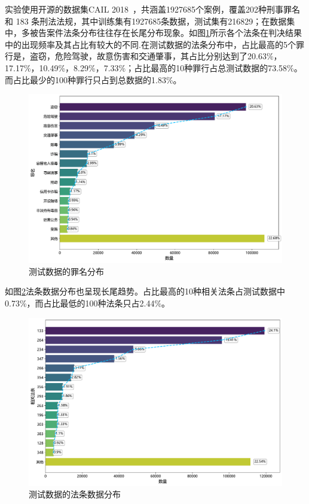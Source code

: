 实验使用开源的数据集CAIL 2018~\cite{xiao2018cail2018largescalelegaldataset}，共涵盖1927685个案例，覆盖202种刑事罪名和 183 条刑法法规，其中训练集有1927685条数据，测试集有216829；在数据集中，多被告案件法条分布往往存在长尾分布现象。如图\ref{fig:acc_dis}所示各个法条在判决结果中的出现频率及其占比有较大的不同.在测试数据的法条分布中，占比最高的5个罪行是，盗窃，危险驾驶，故意伤害和交通肇事，其占比分别达到了20.63\%，17.17\%，10.49\%，8.29\%，7.33\%；占比最高的10种罪行占总测试数据的73.58\%。而占比最少的100种罪行只占到总数据的1.83\%。
\begin{figure}[H]
		\centering
		\includegraphics[width=1\linewidth]{fig/accusation_distribution.pdf}
		\caption{测试数据的罪名分布}
		\label{fig:acc_dis}
\end{figure}
如图\ref{fig:art_dis}法条数据分布也呈现长尾趋势。占比最高的10种相关法条占测试数据中0.73\%，而占比最低的100种法条只占2.44\%。
\begin{figure}[H]
    \centering
    \includegraphics[width=1\linewidth]{fig/article_distribution.pdf}
    \caption{测试数据的法条数据分布}
    \label{fig:art_dis}
\end{figure}
